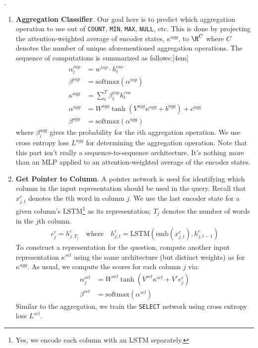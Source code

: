 \documentclass[11pt]{article}
\newcommand\myspace[1][]{\vspace{#1\bigskipamount}}
\newcommand\p{\Needspace{10\baselineskip} \noindent}
\begin{document}
\myspace
\p {}.
\begin{enumerate}
	\item \textbf{Aggregation Classifier}. Our goal here is to predict which aggregation operation to use out of \texttt{COUNT}, \texttt{MIN}, \texttt{MAX}, \texttt{NULL}, etc. This is done by projecting the attention-weighted average of encoder states, $\kappa^{agg}$, to $\R^{C}$ where $C$ denotes the number of unique aforementioned aggregation operations. The sequence of computations is summarized as follows:[4em]
	\begin{align}
		\alpha_t^{inp} 	&= w^{inp} \cdot h_t^{enc} \label{seq2sql-attn} \\
		\beta^{inp} 	&= \text{softmax}\left( \alpha^{inp} \right) \\
		\kappa^{agg} 	&= \sum_t^T \beta_t^{inp} h_t^{enc} \\
		\alpha^{agg} 	&= W^{agg} \tanh\left( V^{agg} \kappa^{agg} + b^{agg} \right) + c^{agg} \\
		\beta^{agg} 	&= \text{softmax}\left( \alpha^{agg} \right)
	\end{align}
	where $\beta_i^{agg}$ gives the probability for the $i$th aggregation operation. We use cross entropy loss $L^{agg}$ for determining the aggregation operation. Note that this part isn't really a sequence-to-sequence architecture. It's nothing more than an MLP applied to an attention-weighted average of the encoder states.
	
	
	\item \textbf{Get Pointer to Column}. A pointer network is used for identifying which column in the input representation should be used in the query. Recall that $x_{j,t}^c$ denotes the $t$th word in column $j$. We use the last encoder state for a given column's LSTM\footnote{Yes, we encode each column with an LSTM separately.} as its representation; $T_j$ denotes the number of words in the $j$th column.
	\begin{align}
		e_j^c = h_{j,T_j}^c \quad \text{where} \quad 
		h_{j,t}^c = \text{LSTM}\left( \text{emb}(x_{j,t}^c) , h_{j,t-1}^c \right)
	\end{align}
	To construct a representation for the question, compute another input representation $\kappa^{sel}$ using the same architecture (but distinct weights) as for $\kappa^{agg}$. As usual, we compute the scores for each column $j$ via:
	\begin{align}
		\alpha_j^{sel} &= W^{sel} \tanh\left( V^{sel} \kappa^{sel} + V^c e_j^c \right) \\
		\beta^{sel} &= \text{softmax}\left( \alpha^{sel} \right)
	\end{align}
	Similar to the aggregation, we train the \texttt{SELECT} network using cross entropy loss $L^{sel}$. 
	

\end{enumerate}
\end{document}
